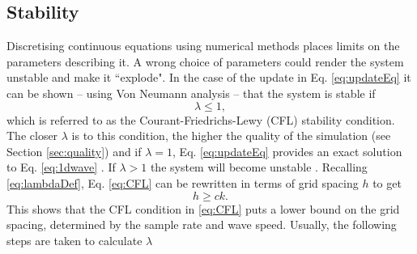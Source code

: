 \subsection{Stability}\label{sec:stability}
Discretising continuous equations using numerical methods places limits on the parameters describing it. A wrong choice of parameters could render the system unstable and make it ``explode". In the case of the update in Eq. \eqref{eq:updateEq} it can be shown -- using Von Neumann analysis \cite{Strikwerda1989} -- that the system is stable if
\begin{equation}\label{eq:CFL}
    \lambda \leq 1,
\end{equation}
which is referred to as the Courant-Friedrichs-Lewy (CFL) stability condition. The closer $\lambda$ is to this condition, the higher the quality of the simulation (see Section \ref{sec:quality}) and if $\lambda = 1$, Eq. \eqref{eq:updateEq} provides an exact solution to Eq. \eqref{eq:1dwave}%
. If $\lambda > 1$ the system will become unstable
.
%
Recalling \eqref{eq:lambdaDef}, Eq. \eqref{eq:CFL} can be rewritten in terms of grid spacing $h$ to get
\begin{equation}\label{eq:stabilityCond}
    h \geq ck.
\end{equation}
This shows that the CFL condition in \eqref{eq:CFL} puts a lower bound on the grid spacing, determined by the sample rate and wave speed. Usually, the following steps are taken to calculate $\lambda$
